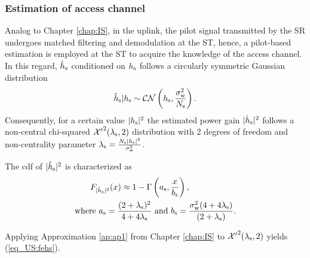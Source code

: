 \subsubsection{Estimation of access channel}
Analog to Chapter \ref{chap:IS}, in the uplink, the pilot signal transmitted by the SR undergoes matched filtering and demodulation at the ST, hence, a pilot-based estimation is employed at the ST to acquire the knowledge of the access channel. %
In this regard, $\hat{h}_{\text{s}}$ conditioned on $h_{\text{s}}$ follows a circularly symmetric Gaussian distribution
\begin{align}
\hat{h}_{\text{s}}|h_{\text{s}} \sim \mathcal{C} \mathcal{N}\left( h_{\text{s}},\frac{\sigma^2_{\text{w}}}{N_{\text{s}}} \right).
\label{eq_US:ehs} 
\end{align}
Consequently, for a certain value $|h_{\text{s}}|^2$ the estimated power gain $|\hat{h}_{\text{s}}|^2$ follows a non-central chi-squared $\ncchi2(\ls, 2)$ distribution with 2 degrees of freedom and non-centrality parameter $\lambda_{\text{s}} = \frac{N_{\text{s}} |h_{\text{s}}|^2}{\sigma^2_{\text{w}}}$. 
\begin{lemma} \label{lm_US:lm2}
\normalfont
The cdf of $|\hat{h}_{\text{s}}|^2$ is characterized as 
\begin{align}
F_{|\hat{h}_{\text{s}}|^2}(x) \approx 1 - \Gamma&\left(a_{\text{s}}, \frac{x}{b_{\text{s}}}\right) \label{eq_US:fehs},\\ 
\text{where  } a_{\text{s}} = \frac{(2 + \lambda_{\text{s}})^2}{4 + 4 \lambda_{\text{s}}} &\text{ and } b_{\text{s}} = \frac{\sigma^2_{\text{w}} (4 + 4 \lambda_{\text{s}})}{(2 + \lambda_{\text{s}})}. \label{eq_US:para_s} 
\end{align} 
\end{lemma}
\begin{IEEEproof}[Solution]
Applying Approximation \ref{ap:ap1} from Chapter \ref{chap:IS} to $\ncchi2(\ls, 2)$ yields (\ref{eq_US:fehs}). 
\end{IEEEproof}

